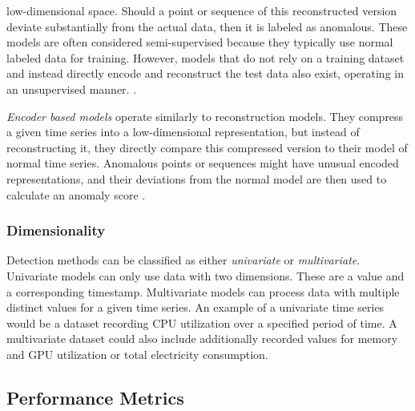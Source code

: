 \documentclass[12pt,oneside]{article}
\begin{document}
low-dimensional space. Should a point or sequence of this reconstructed version deviate substantially from the actual data, then it is labeled as anomalous. These models are often considered semi-supervised because they typically use normal labeled data for training. However, models that do not rely on a training dataset and instead directly encode and reconstruct the test data also exist, operating in an unsupervised manner. \parencites[p.~5]{SchmidlEtAl2022Anomaly}. \par \textit{Encoder based models} operate similarly to reconstruction models. They compress a given time series into a low-dimensional representation, but instead of reconstructing it, they directly compare this compressed version to their model of normal time series. Anomalous points or sequences might have unusual encoded representations, and their deviations from the normal model are then used to calculate an anomaly score \parencites[p.~5-6]{SchmidlEtAl2022Anomaly}.

\subsubsection{Dimensionality}
Detection methods can be classified as either \textit{univariate} or \textit{multivariate}. Univariate models can only use data with two dimensions. These are a value and a corresponding timestamp. Multivariate models can process data with multiple distinct values for a given time series. An example of a univariate time series would be a dataset recording CPU utilization over a specified period of time. A multivariate dataset could also include additionally recorded values for memory and GPU utilization or total electricity consumption.

\subsection{Performance Metrics}
\end{document}
